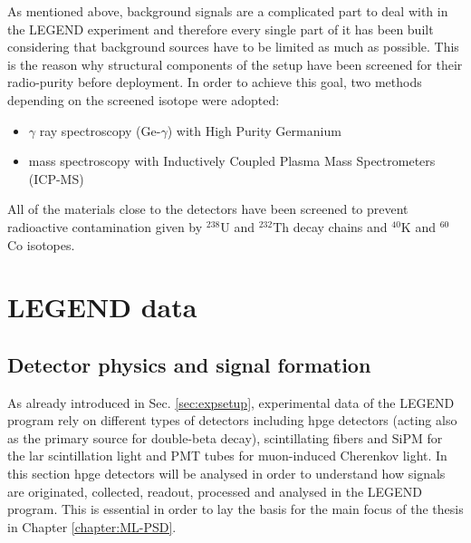 As mentioned above, background signals are a complicated part to deal with in the LEGEND experiment and therefore every single part of it has been built considering that background sources have to be limited as much as possible. This is the reason why structural components of the setup have been screened for their radio-purity before deployment. In order to achieve this goal, two methods depending on the screened isotope were adopted:
\begin{itemize}
    \item $\gamma$ ray spectroscopy (Ge-$\gamma$) with High Purity Germanium 
    \item mass spectroscopy with Inductively Coupled Plasma Mass Spectrometers (ICP-MS)
\end{itemize}

All of the materials close to the detectors have been screened to prevent radioactive contamination given by ${}^{238}$U and ${}^{232}$Th decay chains and ${}^{40}$K and ${}^{60}$Co isotopes.


\section{LEGEND data}
\label{sec:LEGENDdata}
\subsection{Detector physics and signal formation}
\label{subsec:signal-formation}
As already introduced in Sec. \ref{sec:expsetup}, experimental data of the LEGEND program rely on different types of detectors including \ac{hpge} detectors (acting also as the primary source for double-beta decay), scintillating fibers and SiPM for the \ac{lar} scintillation light and PMT tubes for muon-induced Cherenkov light. In this section \ac{hpge} detectors will be analysed in order to understand how signals are originated, collected, readout, processed and analysed in the LEGEND program. This is essential in order to lay the basis for the main focus of the thesis in Chapter \ref{chapter:ML-PSD}.

